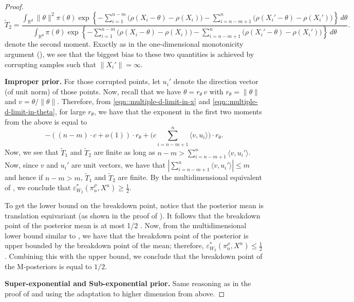 \documentclass[11pt, oneside]{amsart}
\theoremstyle{definition}   %
\newcommand{\R}{\mathbb{R}}
\newcommand{\loss}{\rho}
\begin{document}
\begin{proof}
\begin{equation*}
        \widetilde T_2 = \frac{\int_{\R^d} \| \theta \|^2 \pi(\theta) \exp \left \{-\sum_{i=1}^{n-m} \bigl ( \loss(X_i - \theta) - \loss(X_i) \bigr ) - \sum_{i=n - m +1}^{n} \bigl ( \loss(X_i' - \theta) - \loss(X_i') \bigr ) \right \} \, d\theta}{\int_{\R^d} \pi(\theta) \exp \left \{-\sum_{i=1}^{n-m} \bigl ( \loss(X_i - \theta) - \loss(X_i) \bigr ) - \sum_{i=n - m +1}^{n} \bigl ( \loss(X_i' - \theta) - \loss(X_i') \bigr ) \right \} \, d\theta}.
    \end{equation*}
    denote the second moment.
    Exactly as in the one-dimensional monotonicity argument (), we see that the biggest bias to these two quantities is achieved by corrupting samples such that \( \| X_i' \| = \infty\).  
    
    \textbf{Improper prior.} For those corrupted points, let \( u_i' \) denote the direction vector (of unit norm) of those points.  Now, recall that we have $\theta = r_\theta\,v$ with $r_\theta=\|\theta\|$ and $v=\theta/\|\theta\|$. Therefore, from \eqref{eqn::multiple-d-limit-in-x} and \eqref{eqn::multiple-d-limit-in-theta}, for large \( r_\theta\), we have that the exponent in the first two moments from the above is equal to
    \[
        - \left ((n - m ) \cdot c + o(1) \right ) \cdot r_\theta + \big ( c \sum_{i=n - m +1}^{n} \langle v, u_i \rangle \big ) \cdot r_\theta.
    \]
    Now, we see that \( \widetilde T_1 \) and \( \widetilde T_2\) are finite as long as \( n -m > \sum_{i=n - m +1}^{n} \langle v, u_i' \rangle \). Now, since \( v \) and \( u_i'\) are unit vectors, we have that \( \left | \sum_{i=n - m +1}^{n} \langle v, u_i' \rangle \right | \leq m \) and hence if \( n - m >m\), \( \widetilde T_1 \) and \( \widetilde T_2\) are finite. By the multidimensional equivalent of , we conclude that \( \varepsilon^*_{W_2}(\pi^\rho_n, X^n) \geq \frac{1}{2}\).

    To get the lower bound on the breakdown point, notice that the posterior mean is translation equivariant (as shown in the proof of ).
    It follows that the breakdown point of the posterior mean is at most 1/2 \citep{donoho:huber1983}. Now, from the multidimensional lower bound similar to , we have that the breakdown point of the posterior is upper bounded by the breakdown point of the mean; therefore, \( \varepsilon^*_{W_2}(\pi^\rho_n, X^n) \leq \frac{1}{2}\). Combining this with the upper bound, we conclude that the breakdown point of the M-posteriors is equal to \(1/2\).

    \textbf{Super-exponential and Sub-exponential prior.} Same reasoning as in the proof of  and using the adaptation to higher dimension from above.
\end{proof}
\end{document}
